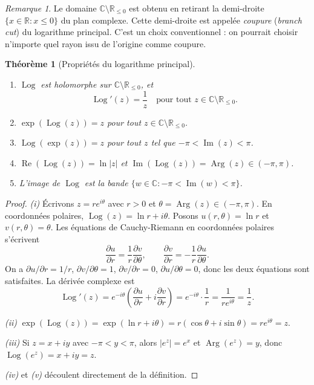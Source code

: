 \documentclass[12pt,a4paper,openany]{book}
\theoremstyle{definition}
\theoremstyle{plain}
\newtheorem{theoreme}[definition]{Théorème}
\theoremstyle{remark}
\newtheorem{remarque}[definition]{Remarque}
\newcommand{\C}{\mathbb{C}}
\newcommand{\R}{\mathbb{R}}
\DeclareMathOperator{\re}{Re}
\DeclareMathOperator{\im}{Im}
\DeclareMathOperator{\Arg}{Arg}
\DeclareMathOperator{\Log}{Log}
\newcommand{\abs}[1]{\left|#1\right|}
\begin{document}
\begin{remarque}\label{rem:log-domaine}
Le domaine $\C \setminus \R_{\leq 0}$ est obtenu en retirant la demi-droite
$\{x \in \R : x \leq 0\}$ du plan complexe. Cette demi-droite est appelée
\emph{coupure} (\textit{branch cut}) du logarithme principal. C'est un choix
conventionnel : on pourrait choisir n'importe quel rayon issu de l'origine comme coupure.
\end{remarque}

\begin{theoreme}[Propriétés du logarithme principal]\label{thm:proprietes-log}
\leavevmode
\begin{enumerate}[label=(\roman*)]
  \item $\Log$ est holomorphe sur $\C \setminus \R_{\leq 0}$, et
  \[
    \Log'(z) = \frac{1}{z} \quad \text{pour tout } z \in \C \setminus \R_{\leq 0}.
  \]
  \item $\exp(\Log(z)) = z$ pour tout $z \in \C \setminus \R_{\leq 0}$.
  \item $\Log(\exp(z)) = z$ pour tout $z$ tel que $-\pi < \im(z) < \pi$.
  \item $\re(\Log(z)) = \ln\abs{z}$ et $\im(\Log(z)) = \Arg(z) \in (-\pi,\pi)$.
  \item L'image de $\Log$ est la bande $\{w \in \C : -\pi < \im(w) < \pi\}$.
\end{enumerate}
\end{theoreme}

\begin{proof}
\emph{(i)} Écrivons $z = re^{i\theta}$ avec $r > 0$ et $\theta = \Arg(z) \in (-\pi,\pi)$. En coordonnées polaires, $\Log(z) = \ln r + i\theta$. Posons $u(r,\theta) = \ln r$ et $v(r,\theta) = \theta$. Les équations de Cauchy-Riemann en coordonnées polaires s'écrivent
\[
  \frac{\partial u}{\partial r} = \frac{1}{r}\frac{\partial v}{\partial \theta}, \qquad
  \frac{\partial v}{\partial r} = -\frac{1}{r}\frac{\partial u}{\partial \theta}.
\]
On a $\partial u/\partial r = 1/r$, $\partial v/\partial \theta = 1$, $\partial v/\partial r = 0$, $\partial u/\partial \theta = 0$, donc les deux équations sont satisfaites. La dérivée complexe est
\[
  \Log'(z) = e^{-i\theta}\left(\frac{\partial u}{\partial r} + i\frac{\partial v}{\partial r}\right) = e^{-i\theta} \cdot \frac{1}{r} = \frac{1}{re^{i\theta}} = \frac{1}{z}.
\]

\emph{(ii)} $\exp(\Log(z)) = \exp(\ln r + i\theta) = r(\cos\theta + i\sin\theta) = re^{i\theta} = z$.

\emph{(iii)} Si $z = x + iy$ avec $-\pi < y < \pi$, alors $\abs{e^z} = e^x$ et $\Arg(e^z) = y$, donc $\Log(e^z) = x + iy = z$.

\emph{(iv)} et \emph{(v)} découlent directement de la définition.
\end{proof}
\end{document}
